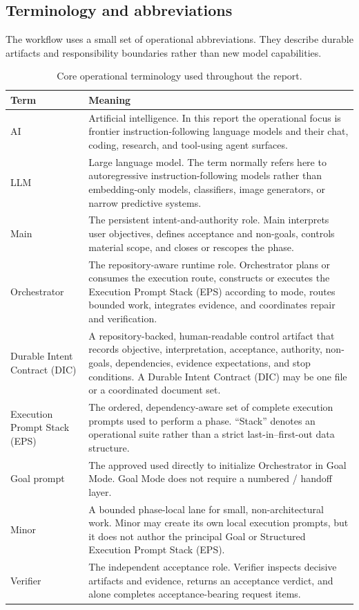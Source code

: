 \documentclass[11pt,a4paper]{article}
\newcommand{\code}[1]{\texttt{\detokenize{#1}}}
\begin{document}
\subsection{Terminology and abbreviations}\label{sec:terminology}

The workflow uses a small set of operational abbreviations. They describe durable artifacts and
responsibility boundaries rather than new model capabilities.

\begin{table}[H]
\centering
\caption{Core operational terminology used throughout the report.}
\begin{tabularx}{\textwidth}{P{0.19\textwidth}Y}
\toprule
\textbf{Term} & \textbf{Meaning} \\
\midrule
AI & Artificial intelligence. In this report the operational focus is frontier instruction-following language models and their chat, coding, research, and tool-using agent surfaces. \\
LLM & Large language model. The term normally refers here to autoregressive instruction-following models rather than embedding-only models, classifiers, image generators, or narrow predictive systems. \\
Main & The persistent intent-and-authority role. Main interprets user objectives, defines acceptance and non-goals, controls material scope, and closes or rescopes the phase. \\
Orchestrator & The repository-aware runtime role. Orchestrator plans or consumes the execution route, constructs or executes the Execution Prompt Stack (EPS) according to mode, routes bounded work, integrates evidence, and coordinates repair and verification. \\
Durable Intent Contract (DIC) & A repository-backed, human-readable control artifact that records objective, interpretation, acceptance, authority, non-goals, dependencies, evidence expectations, and stop conditions. A Durable Intent Contract (DIC) may be one file or a coordinated document set. \\
Execution Prompt Stack (EPS) & The ordered, dependency-aware set of complete execution prompts used to perform a phase. ``Stack'' denotes an operational suite rather than a strict last-in--first-out data structure. \\
Goal prompt & The approved \code{GOAL.md} used directly to initialize Orchestrator in Goal Mode. Goal Mode does not require a numbered \code{000}/\code{001} handoff layer. \\
Minor & A bounded phase-local lane for small, non-architectural work. Minor may create its own local execution prompts, but it does not author the principal Goal or Structured Execution Prompt Stack (EPS). \\
Verifier & The independent acceptance role. Verifier inspects decisive artifacts and evidence, returns an acceptance verdict, and alone completes acceptance-bearing request items. \\
\bottomrule
\end{tabularx}
\end{table}
\end{document}
